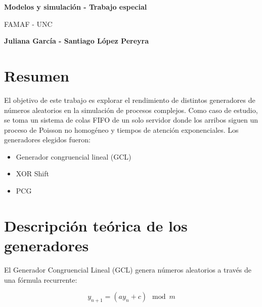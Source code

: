 \documentclass[a4paper, 12pt]{article}
\begin{document}
\begin{titlepage}
   \begin{center}
       \vspace*{1cm}

       \Huge
       \textbf{Modelos y simulación - Trabajo especial}

       \vspace{0.5cm}
        FAMAF - UNC
            
       \vspace{1.5cm}
       \large
       \textbf{Juliana García - Santiago López Pereyra}
       \normalsize

       \vfill
            
            
     
   \end{center}
\end{titlepage}

   
\maketitle
\pagebreak

\section{Resumen}

El objetivo de este trabajo es explorar el rendimiento de distintos generadores
de números aleatorios en la simulación de procesos complejos. Como caso de
estudio, se toma un sistema de colas FIFO de un solo servidor donde los arribos
siguen un proceso de Poisson no homogéneo y tiempos de atención exponenciales.
Los generadores elegidos fueron:

\begin{itemize}
    \item Generador congruencial lineal (GCL)
    \item XOR Shift 
    \item PCG
\end{itemize}

\section{Descripción teórica de los generadores}

El Generador Congruencial Lineal (GCL) genera números aleatorios a través de una
fórmula recurrente:

\begin{equation*}
y_{n+1} = (ay_n + c) \mod m
\end{equation*}
\end{document}
